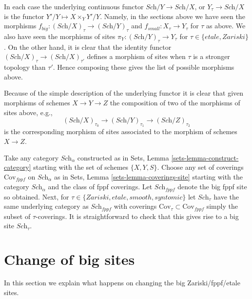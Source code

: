 In each case the underlying continuous functor
$\textit{Sch}/Y \to \textit{Sch}/X$, or
$Y_\tau \to \textit{Sch}/X$
is the functor $Y'/Y \mapsto X \times_Y Y'/Y$. Namely, in the sections
above we have seen the morphisms
$f_{big} : (\textit{Sch}/X)_\tau \to (\textit{Sch}/Y)_\tau$
and
$f_{small} : X_\tau \to Y_\tau$
for $\tau$ as above.
We also have seen the morphisms of sites
$\pi_Y : (\textit{Sch}/Y)_\tau \to Y_\tau$ for
$\tau \in \{etale, Zariski\}$.
On the other hand, it is clear that the identity functor
$(\textit{Sch}/X)_\tau \to (\textit{Sch}/X)_{\tau'}$ defines
a morphism of sites when $\tau$ is a stronger topology than
$\tau'$. Hence composing these gives the list of possible morphisms
above.

\medskip\noindent
Because of the simple description of the underlying functor it
is clear that given morphisms of schemes $X \to Y \to Z$ the
composition of two of the morphisms of sites above, e.g.,
$$
(\textit{Sch}/X)_{\tau_0} \longrightarrow
(\textit{Sch}/Y)_{\tau_1} \longrightarrow
(\textit{Sch}/Z)_{\tau_2}
$$
is the corresponding morphism of sites associated to the morphism
of schemes $X \to Z$.

\begin{remark}
\label{remark-choice-sites}
Take any category $\textit{Sch}_\alpha$ constructed as in
Sets, Lemma \ref{sets-lemma-construct-category}
starting with the set of schemes $\{X, Y, S\}$. Choose any set of
coverings $\text{Cov}_{fppf}$ on $\textit{Sch}_\alpha$ as in
Sets, Lemma \ref{sets-lemma-coverings-site}
starting with the category $\textit{Sch}_\alpha$ and the class of fppf
coverings. Let $\textit{Sch}_{fppf}$ denote the big fppf site so
obtained. Next, for $\tau \in \{Zariski, etale, smooth, syntomic\}$
let $\textit{Sch}_\tau$ have the same underlying category as
$\textit{Sch}_{fppf}$ with coverings
$\text{Cov}_\tau \subset \text{Cov}_{fppf}$ simply the subset of
$\tau$-coverings. It is straightforward to check that this gives rise
to a big site $\textit{Sch}_\tau$.
\end{remark}









\section{Change of big sites}
\label{section-change-alpha}

\noindent
In this section we explain what happens on changing the big
Zariski/fppf/etale sites.

